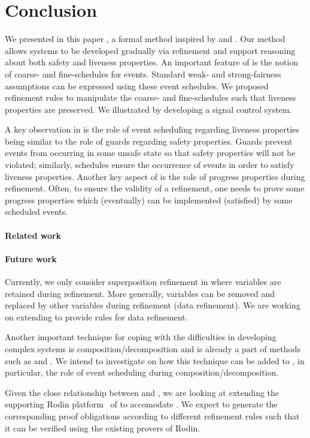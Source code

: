\section{Conclusion}
\label{sec:conclusion}

We presented in this paper \unitb, a formal method inspired by \eventB
and \unity.  Our method allows systems to be developed gradually via
refinement and support reasoning about both safety and liveness
properties.  An important feature of \unitb is the notion of coarse-
and fine-schedules for events.  Standard weak- and strong-fairness
assumptions can be expressed using these event schedules.  We
proposed refinement rules to manipulate the coarse-
and fine-schedules such that liveness properties are
preserved.  We illustrated \unitb by developing a signal control
system.

A key observation in \unitb is the role of event scheduling regarding
liveness properties being similar to the role of guards regarding safety
properties.  Guards prevent events from occurring in some unsafe state so
that safety properties will not be violated; similarly, schedules ensure the
occurrence of events in order to satisfy liveness properties.  Another
key aspect of \unitb is the role of progress properties during
refinement.  Often, to ensure the validity of a refinement, one needs
to prove some progress properties which (eventually) can be
implemented (satisfied) by some scheduled events.

\paragraph{Related work}


\paragraph{Future work}
Currently, we only consider superposition refinement in \unitb where
variables are retained during refinement.  More generally, variables
can be removed and replaced by other variables during refinement (data
refinement). We are working on extending \unitb to provide rules for data
refinement.

Another important technique for coping with the difficulties in
developing complex systems is composition/decomposition and is already
a part of methods such as \eventB and \unity.  We intend to investigate
on how this technique can be added to \unitb, in particular, the role
of event scheduling during composition/decomposition.

Given the close relationship between \unitb and \eventB, we are
looking at extending the supporting Rodin
platform~\cite{abrial10:_rodin} of \eventB to accomodate \unitb.  We
expect to generate the corresponding proof obligations according to
different refinement rules such that it can be verified using the
existing provers of Rodin.


